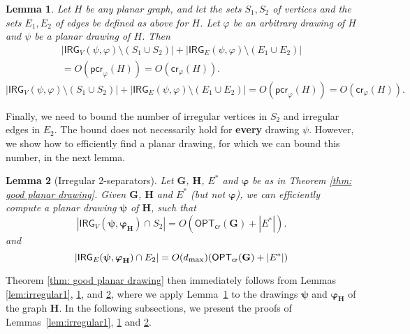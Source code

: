 \documentclass[twoside,leqno,twocolumn]{article}
\newtheorem{lemma}{Lemma}
\renewcommand{\phi}{\varphi}
\newcommand{\optcro}[1]{\mathsf{OPT}_{\mathsf{cr}}(#1)}
\newcommand{\pcro}{\mathsf{pcr}}
\newcommand{\cro}{\mathsf{cr}}
\newcommand{\irreg}{\mathsf{IRG}}
\newcommand{\dmax}{d_{\mbox{\textup{\footnotesize{max}}}}}
\newcommand{\G}{{\mathbf{G}}}
\renewcommand{\H}{{\mathbf{H}}}
\newcommand{\bphi}{{\boldsymbol{\varphi}}}
\newcommand{\bpsi}{{\boldsymbol{\psi}}}
\begin{document}
\begin{lemma}\label{lem:irregular3}
Let $H$ be any planar graph, and let the sets $S_1,S_2$ of vertices and the sets $E_1,E_2$ of edges be defined as above for $H$. Let $\phi$ be an arbitrary drawing of $H$ and $\psi$ be a planar drawing of $H$.
Then
\ifabstract
\begin{multline*}
|\irreg_V(\psi, \phi)\setminus (S_1\cup S_2)| + |\irreg_E(\psi, \phi)\setminus (E_1\cup E_2)| \\= O(\pcro_{\phi}(H))=O(\cro_{\phi}(H)).
\end{multline*}
\fi\iffull
$$
|\irreg_V(\psi, \phi)\setminus (S_1\cup S_2)| + |\irreg_E(\psi, \phi)\setminus (E_1\cup E_2)| = O(\pcro_{\phi}(H))=O(\cro_{\phi}(H)).
$$
\fi
\end{lemma}
Finally, we need to bound the number of irregular vertices in $S_2$ and irregular edges in $E_2$. The bound does  not necessarily hold for {\bf every} drawing $\psi$. However, we show how to efficiently find a planar drawing, for which we can bound this number, in the next lemma.


\begin{lemma}[Irregular 2-separators]\label{lem:irregular2}
Let $\G$, $\H$, $E^*$ and $\bphi$ be as in Theorem \ref{thm: good planar drawing}.
Given $\G$, $\H$ and $E^*$ (but not $\bphi$), 
we can efficiently compute a planar drawing $\bpsi$ of $\H$, such that
\[
|\irreg_V(\bpsi, \bphi_{\H})\cap S_2| =O(\optcro{\G} + |E^*|).\]
and
\[|\irreg_E(\bpsi, \bphi_{\H})\cap E_2|=O(\dmax)(\optcro{\G} + |E^*|)
\]
\end{lemma}

Theorem \ref{thm: good planar drawing} then immediately follows from Lemmas \ref{lem:irregular1}, \ref{lem:irregular3}, and \ref{lem:irregular2}, where we apply Lemma~\ref{lem:irregular3} to the drawings $\bpsi$ and $\bphi_{\H}$ of the graph $\H$.
In the following subsections, we present the proofs of Lemmas~\ref{lem:irregular1}, \ref{lem:irregular3} and \ref{lem:irregular2}.
\end{document}
